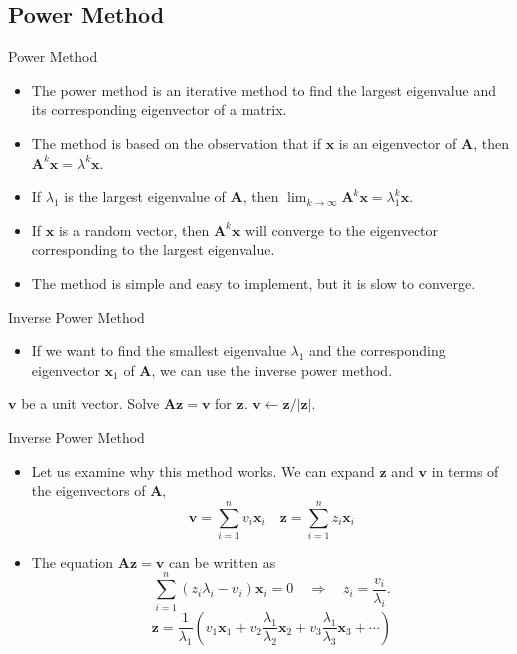 \documentclass{beamer}
\begin{document}
\subsection[Power Method]{Power Method}
\begin{frame}{Power Method}
\begin{itemize}
\item The power method is an iterative method to find the largest eigenvalue and its corresponding eigenvector of a matrix.
\item The method is based on the observation that if $\mathbf{x}$ is an eigenvector of $\mathbf{A}$, then $\mathbf{A}^k\mathbf{x}=\lambda^k\mathbf{x}$.
\item If $\lambda_1$ is the largest eigenvalue of $\mathbf{A}$, then $\lim_{k\to \infty} \mathbf{A}^k\mathbf{x}=\lambda_1^k\mathbf{x}$.
\item If $\mathbf{x}$ is a random vector, then $\mathbf{A}^k\mathbf{x}$ will converge to the eigenvector corresponding to the largest eigenvalue.
\item The method is simple and easy to implement, but it is slow to converge.
\end{itemize}
\end{frame}
\begin{frame}[fragile]{Inverse Power Method}
    \begin{itemize}
        \item If we want to find the smallest eigenvalue $\lambda_1$ and the corresponding eigenvector $\mathbf{x}_1$
        of $\mathbf{A}$, we can use the inverse power method.
    \end{itemize}
    \begin{algorithm}[H]
        \caption{Inverse Power Method}
        \begin{algorithmic}
            \State $\mathbf{v}$ be a unit vector.
                \State Solve $\mathbf{A z}=\mathbf{v}$ for  $\mathbf{z}$.
                \State $\mathbf{v}\gets \mathbf{z} /|\mathbf{z}|$.
            \EndWhile
        \end{algorithmic}
    \end{algorithm}
\end{frame}
\begin{frame}{Inverse Power Method}
    \begin{itemize}
        \item Let us examine why this method works. We can expand 
        $\mathbf{z}$ and $\mathbf{v}$ in terms of the eigenvectors of $\mathbf{A}$,
        \[
            \mathbf{v}=\sum_{i=1}^n v_i \mathbf{x}_i \quad \mathbf{z}=\sum_{i=1}^n z_i \mathbf{x}_i
        \]
        \item The equation $\mathbf{A z}=\mathbf{v}$ can be written as
        \[
            \sum_{i=1}^n ( z_i \lambda_i - v_i )\mathbf{x}_i=0 \quad \Rightarrow \quad z_i=\frac{v_i}{\lambda_i}.
        \]
        \[
            \mathbf{z} 
             =\frac{1}{\lambda_1}\left(v_1 \mathbf{x}_1+v_2 \frac{\lambda_1}{\lambda_2} \mathbf{x}_2+v_3 \frac{\lambda_1}{\lambda_3} \mathbf{x}_3+\cdots\right)
            \]

    \end{itemize}
\end{frame}
\end{document}

